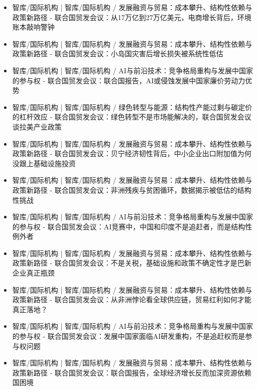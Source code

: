 \documentclass[11pt]{ctexart}
\begin{document}
\begin{itemize}
  \item [R026] 智库/国际机构 | 智库/国际机构 / 发展融资与贸易：成本攀升、结构性依赖与政策新路径 - 联合国贸发会议：从17万亿到27万亿美元，电商增长背后，环境账本敲响警钟
  \item [R027] 智库/国际机构 | 智库/国际机构 / 发展融资与贸易：成本攀升、结构性依赖与政策新路径 - 联合国贸发会议：小岛国灾害后增长损失被系统性低估
  \item [R028] 智库/国际机构 | 智库/国际机构 / AI与前沿技术：竞争格局重构与发展中国家的参与权 - 联合国贸发会议：联合国报告，AI或侵蚀发展中国家廉价劳动力优势
  \item [R029] 智库/国际机构 | 智库/国际机构 / 绿色转型与能源：结构性产能过剩与碳定价的杠杆效应 - 联合国贸发会议：绿色转型不是市场能解决的，联合国贸发会议谈拉美产业政策
  \item [R030] 智库/国际机构 | 智库/国际机构 / 发展融资与贸易：成本攀升、结构性依赖与政策新路径 - 联合国贸发会议：贝宁经济韧性背后，中小企业出口附加值为何没跟上基础设施投资
  \item [R031] 智库/国际机构 | 智库/国际机构 / 发展融资与贸易：成本攀升、结构性依赖与政策新路径 - 联合国贸发会议：非洲残疾与贫困循环，数据揭示被低估的结构性挑战
  \item [R032] 智库/国际机构 | 智库/国际机构 / AI与前沿技术：竞争格局重构与发展中国家的参与权 - 联合国贸发会议：AI竞赛中，中国和印度不是追赶者，而是结构性例外者
  \item [R033] 智库/国际机构 | 智库/国际机构 / 发展融资与贸易：成本攀升、结构性依赖与政策新路径 - 联合国贸发会议：不是关税，基础设施和政策不确定性才是巴新企业真正瓶颈
  \item [R034] 智库/国际机构 | 智库/国际机构 / 发展融资与贸易：成本攀升、结构性依赖与政策新路径 - 联合国贸发会议：从非洲悖论看全球供应链，贸易红利如何才能真正落地？
  \item [R035] 智库/国际机构 | 智库/国际机构 / AI与前沿技术：竞争格局重构与发展中国家的参与权 - 联合国贸发会议：发展中国家面临AI研发重构，不是追赶权而是参与权问题
  \item [R036] 智库/国际机构 | 智库/国际机构 / 发展融资与贸易：成本攀升、结构性依赖与政策新路径 - 联合国贸发会议：联合国报告，全球经济增长反而加深资源依赖国困境
\end{itemize}
\end{document}
